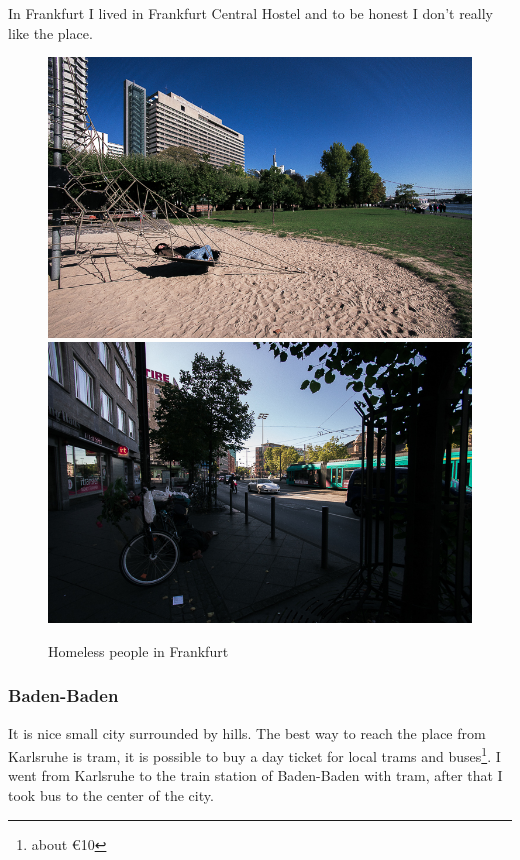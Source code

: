 \documentclass[english]{article}
\begin{document}
In Frankfurt I lived in Frankfurt Central Hostel and to be honest I don't really like the place.

\begin{figure}
\includegraphics[scale=0.33]{Germany_travel/fk3}\includegraphics[scale=0.33]{Germany_travel/fk4}\\
\caption{Homeless people in Frankfurt}
\end{figure}

\subsubsection{Baden-Baden}
It is nice small city surrounded by hills. The best way to reach the place from Karlsruhe is tram, it is possible to buy a day ticket for local trams and buses\footnote{about \euro 10}. I went from Karlsruhe to the train station of Baden-Baden with tram, after that I took bus to the center of the city.\\
\end{document}
